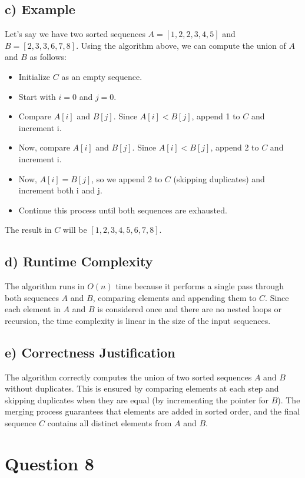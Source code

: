 \documentclass[12pt, letterpaper]{article}
\begin{document}
\subsection{c) Example}
Let's say we have two sorted sequences $A = [1, 2, 2, 3, 4, 5]$ and $B = [2, 3, 3, 6, 7, 8]$. Using the algorithm above, we can compute the union of $A$ and $B$ as follows:
\begin{itemize}
    \item Initialize $C$ as an empty sequence.
    \item Start with $i = 0$ and $j = 0$.
    \item Compare $A[i]$ and $B[j]$. Since $A[i] < B[j]$, append 1 to $C$ and increment i.
    \item Now, compare $A[i]$ and $B[j]$. Since $A[i] < B[j]$, append 2 to $C$ and increment i.
    \item Now, $A[i] = B[j]$, so we append 2 to $C$ (skipping duplicates) and increment both i and j.
    \item Continue this process until both sequences are exhausted.
\end{itemize}


The result in $C$ will be $[1, 2, 3, 4, 5, 6, 7, 8]$.

\subsection{d) Runtime Complexity}
The algorithm runs in $O(n)$ time because it performs a single pass through both sequences $A$ and $B$, comparing elements and appending them to $C$. Since each element in $A$ and $B$ is considered once and there are no nested loops or recursion, the time complexity is linear in the size of the input sequences.

\subsection{e) Correctness Justification}
The algorithm correctly computes the union of two sorted sequences $A$ and $B$ without duplicates. This is ensured by comparing elements at each step and skipping duplicates when they are equal (by incrementing the pointer for $B$). The merging process guarantees that elements are added in sorted order, and the final sequence $C$ contains all distinct elements from $A$ and $B$.

\newpage

\section{Question 8}
\end{document}
